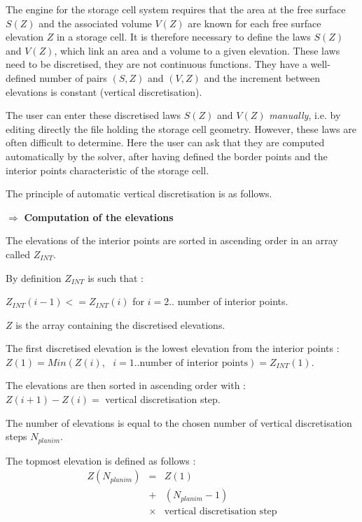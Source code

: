 The engine for the storage cell system requires that the area at the free surface $S(Z)$ and the associated volume $V(Z)$ are known for each free surface elevation $Z$ in a storage cell. It is therefore necessary to define the laws $S(Z)$ and $V(Z)$, which link an area and a volume to a given elevation. These laws need to be discretised, they are not continuous functions. They have a well-defined number of pairs $(S,Z)$ and $(V,Z)$ and the increment between elevations is constant (vertical discretisation).

The user can enter these discretised laws $S(Z)$ and $V(Z)$ \textit{manually}, i.e. by editing directly the file holding the storage cell geometry. However, these laws are often difficult to determine. Here the user can ask that they are computed automatically by the solver, after having defined the border points and the interior points characteristic of the storage cell.

The principle of automatic vertical discretisation is as follows.

$\Longrightarrow$ \textbf{Computation of the elevations}

The elevations of the interior points are sorted in ascending order in an array called $Z_{INT}$.

By definition $Z_{INT}$ is such that :

$Z_{INT}(i-1) <= Z_{INT}(i)$ for $i=2..$ number of interior points.

$Z$ is the array containing the discretised elevations.

The first discretised elevation is the lowest elevation from the interior points : \\
$Z(1) = Min(Z(i),\mbox{ }i=1..\mbox{number of interior points}) = Z_{INT}(1)$.

The elevations are then sorted in ascending order with : \\
$Z(i+1)-Z(i) = $ vertical discretisation step.

The number of elevations is equal to the chosen number of vertical discretisation steps $N_{planim}$.

The topmost elevation is defined as follows :
 \begin{eqnarray}
 Z(N_{planim}) & = & Z(1) \nonumber \\
                & + & (N_{planim}-1) \nonumber \\
                & \times & \mbox{vertical discretisation step} \nonumber
 \end{eqnarray}

